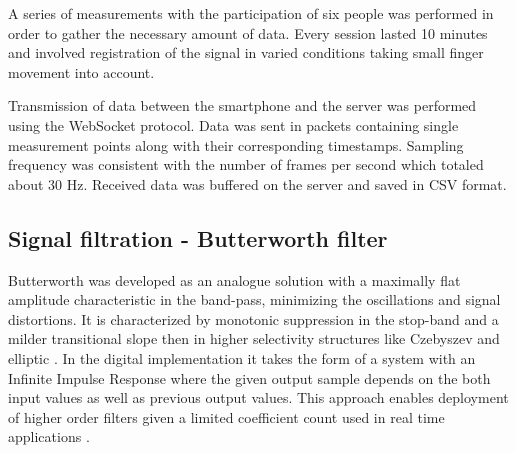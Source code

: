 \documentclass[journal]{IEEEtran}
\begin{document}
A series of measurements with the participation of six people was performed in order to gather the necessary amount of data. Every session lasted 10 minutes and involved registration of the signal in varied conditions taking small finger movement into account.

Transmission of data between the smartphone and the server was performed using the WebSocket protocol. Data was sent in packets containing single measurement points along with their corresponding timestamps. Sampling frequency was consistent with the number of frames per second which totaled about 30 Hz. Received data was buffered on the server and saved in CSV format.

\subsection{Signal filtration - Butterworth filter}
Butterworth was developed as an analogue solution with a maximally flat amplitude characteristic in the band-pass, minimizing the oscillations and signal distortions. It is characterized by monotonic suppression in the stop-band and a milder transitional slope then in higher selectivity structures like Czebyszev and elliptic \cite{22}. In the digital implementation it takes the form of a system with an Infinite Impulse Response where the given output sample depends on the both input values as well as previous output values. This approach enables deployment of higher order filters given a limited coefficient count used in real time applications \cite{23}.
\end{document}
